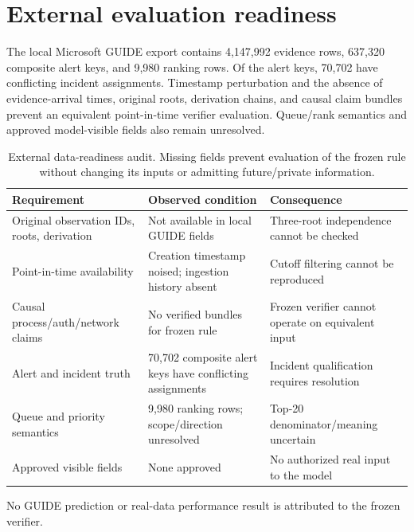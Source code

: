 \section{External evaluation readiness}
The local Microsoft GUIDE export contains 4,147,992 evidence rows, 637,320 composite alert keys, and 9,980 ranking rows. Of the alert keys, 70,702 have conflicting incident assignments. Timestamp perturbation \cite{guide2024} and the absence of evidence-arrival times, original roots, derivation chains, and causal claim bundles prevent an equivalent point-in-time verifier evaluation. Queue/rank semantics and approved model-visible fields also remain unresolved.

\begin{table}[t]\centering\footnotesize\caption{External data-readiness audit. Missing fields prevent evaluation of the frozen rule without changing its inputs or admitting future/private information.}\label{tab:readiness}\begin{tabularx}{\textwidth}{@{}p{}Y Y@{}}\toprule Requirement & Observed condition & Consequence\\\midrule Original observation IDs, roots, derivation & Not available in local GUIDE fields & Three-root independence cannot be checked\\ Point-in-time availability & Creation timestamp noised; ingestion history absent & Cutoff filtering cannot be reproduced\\ Causal process/auth/network claims & No verified bundles for frozen rule & Frozen verifier cannot operate on equivalent input\\ Alert and incident truth & 70,702 composite alert keys have conflicting assignments & Incident qualification requires resolution\\ Queue and priority semantics & 9,980 ranking rows; scope/direction unresolved & Top-20 denominator/meaning uncertain\\ Approved visible fields & None approved & No authorized real input to the model\\\bottomrule\end{tabularx}\end{table}

No GUIDE prediction or real-data performance result is attributed to the frozen verifier.
